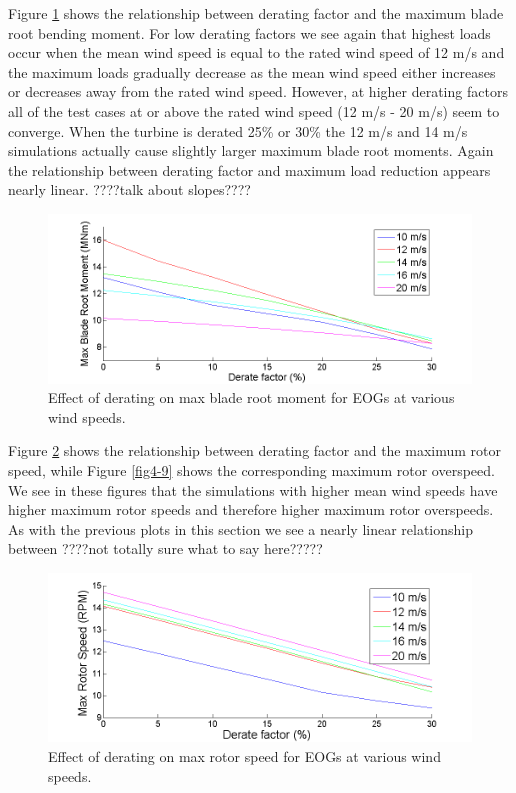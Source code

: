 Figure \ref{fig4-7} shows the relationship between derating factor and the maximum blade root bending moment. For low derating factors we see again that highest loads occur when the mean wind speed is equal to the rated wind speed of 12 m/s and the maximum loads gradually decrease as the mean wind speed either increases or decreases away from the rated wind speed. However, at higher derating factors all of the test cases at or above the rated wind speed (12 m/s - 20 m/s) seem to converge. When the turbine is derated 25\% or 30\% the 12 m/s and 14 m/s simulations actually cause slightly larger maximum blade root moments. Again the relationship between derating factor and maximum load reduction appears nearly linear. ????talk about slopes????

\begin{figure}[htbp]
	\centering
		\includegraphics[trim = {1cm 0 2cm 0}, clip, width = \linewidth]{Figures/ch4Figures/fig4-7.png}
		
	\caption{Effect of derating on max blade root moment for EOGs at various wind speeds.}
	\label{fig4-7}
\end{figure}

Figure \ref{fig4-8} shows the relationship between derating factor and the maximum rotor speed, while Figure \ref{fig4-9} shows the corresponding maximum rotor overspeed. We see in these figures that the simulations with higher mean wind speeds have higher maximum rotor speeds and therefore higher maximum rotor overspeeds. As with the previous plots in this section we see a nearly linear relationship between ????not totally sure what to say here?????

\begin{figure}[htbp]
	\centering
		\includegraphics[trim = {1cm 0 2cm 0}, clip, width = \linewidth]{Figures/ch4Figures/fig4-8.png}
		
	\caption{Effect of derating on max rotor speed for EOGs at various wind speeds.}
	\label{fig4-8}
\end{figure}

